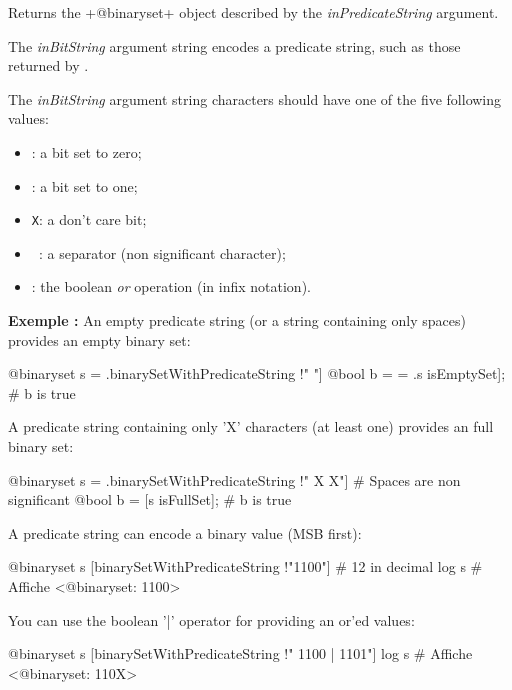 Returns the \ggst+@binaryset+ object described by the \emph{inPredicateString} argument.

The \emph{inBitString} argument string encodes a predicate string, such as those returned by .

\begin{description}
\item The \emph{inBitString} argument string characters should have one of the five following values:
\begin{itemize}
\item \texttt{\textquotesingle}: a bit set to zero;
\item \texttt{\textquotesingle}: a bit set to one;
\item \texttt{\textquotesingle X\textquotesingle}: a don't care bit;
\item \texttt{\textquotesingle~\textquotesingle}: a separator (non significant character);
\item \texttt{\textquotesingle\textbar\textquotesingle}: the boolean \emph{or} operation (in infix notation).
\end{itemize}
\end{description}


\textbf{Exemple :}
An empty predicate string (or a string containing only spaces) provides an empty binary set:
\begin{galgas3}
@binaryset s = .binarySetWithPredicateString !" "]
@bool b = = .s isEmptySet]; # b is true
\end{galgas3}


A predicate string containing only 'X' characters (at least one) provides an full binary set:
\begin{galgas3}
@binaryset s = .binarySetWithPredicateString !" X X"] # Spaces are non significant
@bool b = [s isFullSet]; # b is true
\end{galgas3}


A predicate string can encode a binary value (MSB first):
\begin{galgas3}
@binaryset s [binarySetWithPredicateString !"1100"] # 12 in decimal
log s # Affiche <@binaryset: 1100>
\end{galgas3}


You can use the boolean '|' operator for providing an or'ed values:
\begin{galgas3}
@binaryset s [binarySetWithPredicateString !" 1100 | 1101"]
log s # Affiche <@binaryset: 110X>
\end{galgas3}



